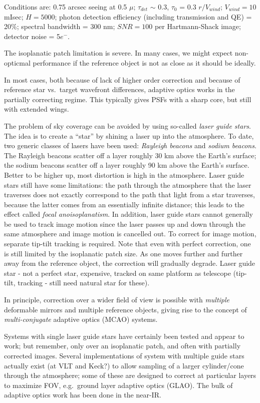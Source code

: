 \documentclass[12pt]{article}
\newcommand{\mynotes}[1]{\textcolor{myBlue}{#1}}
\begin{document}
Conditions are: 0.75 arcsec seeing at 0.5 $\mu$; $\tau_{det}$
$\sim$ 0.3, $\tau_{0}$ = 0.3 $r/V_{wind}$; $V_{wind}=10$ mIsec; $H=5000$;
photon detection efficiency (including transmission and QE) = 20\%;
spectral bandwidth = 300 nm; $SNR=100$ per Hartmann-Shack image;
detector noise = 5$e^{-}$.

The isoplanatic patch limitation is severe. In many cases, we might
expect non-opticmal performance if the reference object is not as
close as it should be ideally.

In most cases, both because of lack of higher order correction and
because of reference star vs.\ target wavefront differences, adaptive
optics works in the partially correcting regime. This typically gives
PSFs with a sharp core, but still with extended wings.

The problem of sky coverage can be avoided by using so-called \textit{laser
guide stars}. The idea is to create a ``star'' by shining a laser up into the
atmosphere. To date, two generic classes of lasers have been used:
\textit{Rayleigh beacons} and \textit{sodium beacons}. The Rayleigh beacons
scatter off a layer roughly 30 km above the Earth's surface; the sodium beacons
scatter off a layer roughly 90 km above the Earth's surface. \mynotes{Better to
be higher up, most distortion is high in the atmosphere.} Laser guide stars
still have some limitations: the path through the atmosphere that the laser
traverses does not exactly correspond to the path that light from a star
traverses, because the latter comes from an essentially infinite distance; this
leads to the effect called \textit{focal anoisoplanatism}. In addition, laser
guide stars cannot generally be used to track image motion since the laser
passes up and down through the same atmosphere and image motion is cancelled
out. To correct for image motion, separate tip-tilt tracking is required. Note
that even with perfect correction, one is still limited by the isoplanatic
patch size. As one moves further and further away from the reference object,
the correction will gradually degrade. \mynotes{Laser guide star - not a
perfect star, expensive, tracked on same platform as telescope (tip-tilt,
tracking - still need natural star for these).}

In principle, correction over a wider field of view is possible with
\emph{multiple} deformable mirrors and multiple reference objects, giving rise
to the concept of \textit{multi-conjugate} adaptive optics (MCAO) systems.

Systems with single laser guide stars have certainly been tested and appear to
work; but remember, only over an isoplanatic patch, and often with partially
corrected images. Several implementations of system with multiple guide stars
actually exist (at VLT and Keck?) to allow sampling of a larger cylinder/cone
through the atmosphere; some of these are designed to correct at particular
layers to maximize FOV, e.g.\ ground layer adaptive optics (GLAO). The bulk of
adaptive optics work has been done in the near-IR.
\end{document}
